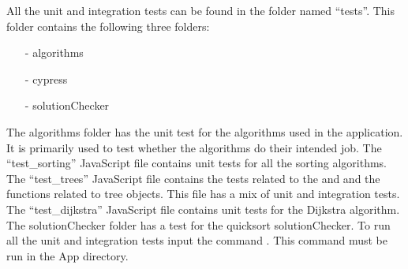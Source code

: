 All the unit and integration tests can be found in the folder named “tests”. This folder contains the following three folders:
\begin{itemize}
    \item[-] algorithms
    \item[-] cypress
    \item[-] solutionChecker
\end{itemize}
The algorithms folder has the unit test for the algorithms used in the application. It is primarily used to test whether the algorithms do their intended job. The “test\_sorting” JavaScript file contains unit tests for all the sorting algorithms. The “test\_trees” JavaScript file contains the tests related to the  and  and the functions related to tree objects. This file has a mix of unit and integration tests. The “test\_dijkstra” JavaScript file contains unit tests for the Dijkstra algorithm. The solutionChecker folder has a test for the quicksort solutionChecker. To run all the unit and integration tests input the command . This command must be run in the App directory.
